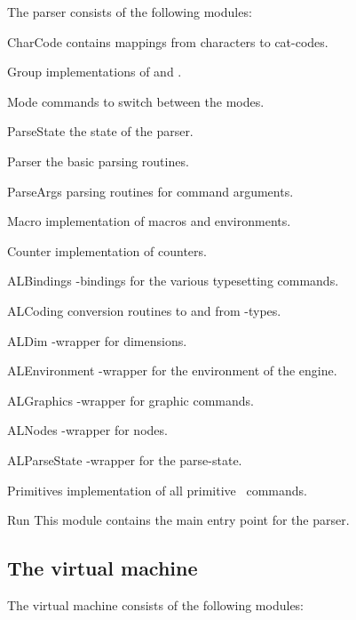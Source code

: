 The parser consists of the following modules\?:

\begin{description}
%
\item{\textsf{\red CharCode}}%
  contains mappings from characters to cat-codes.
\item{\textsf{\red Group}}%
  implementations of \cs{\begingroup} and \cs{\endgroup}.
\item{\textsf{\red Mode}}%
  commands to switch between the modes.
\item{\textsf{\red ParseState}}%
  the state of the parser.
\item{\textsf{\red Parser}}%
  the basic parsing routines.
\item{\textsf{\red ParseArgs}}%
  parsing routines for command arguments.
\item{\textsf{\red Macro}}%
  implementation of macros and environments.
\item{\textsf{\red Counter}}%
  implementation of counters.
\item{\textsf{\red ALBindings}}%
  \AL-bindings for the various typesetting commands.
\item{\textsf{\red ALCoding}}%
  conversion routines to and from \AL-types.
\item{\textsf{\red ALDim}}%
  \AL-wrapper for dimensions.
\item{\textsf{\red ALEnvironment}}%
  \AL-wrapper for the environment of the engine.
\item{\textsf{\red ALGraphics}}%
  \AL-wrapper for graphic commands.
\item{\textsf{\red ALNodes}}%
  \AL-wrapper for nodes.
\item{\textsf{\red ALParseState}}%
  \AL-wrapper for the parse-state.
\item{\textsf{\red Primitives}}%
  implementation of all primitive \ant\ commands.
\item{\textsf{\red Run}}%
  This module contains the main entry point for the parser.
\end{description}

\subsection{The virtual machine}   %

The virtual machine consists of the following modules\?:

